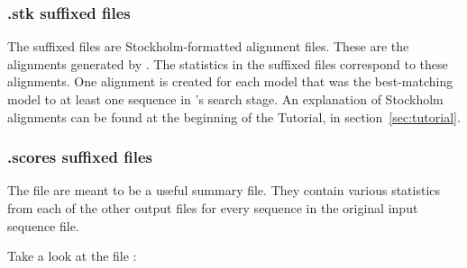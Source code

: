 \subsubsection{.stk suffixed files}
The  suffixed files are Stockholm-formatted alignment
files. These are the alignments generated by . The
statistics in the  suffixed files correspond to these
alignments. One alignment is created for each model that was the
best-matching model to at least one sequence in 's
search stage. An explanation of Stockholm alignments can be found at
the beginning of the Tutorial, in section~\ref{sec:tutorial}.

\subsubsection{.scores suffixed files}

The  file are meant to be a useful summary file.
They contain various statistics from each of the other output files
for every sequence in the original input sequence file. 

Take a look at the file :

